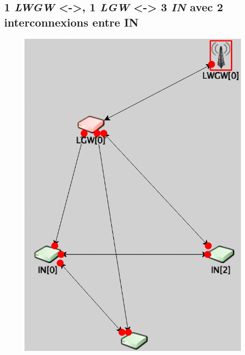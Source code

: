 \documentclass[a4paper]{article}
\begin{document}
\subsection{ 1 \textit{LWGW} <->, 1 \textit{LGW} <-> 3 \textit{IN} avec 2 interconnexions entre IN}
\begin{figure}[h!]
\centering
\includegraphics[scale=0.5]{cas_3_1.png} 
\end{figure}


\newpage
\end{document}
